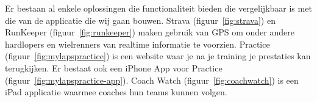 \newcommand{\vergelijkbaresystemen}{}
\label{sec:vergelijkbare-systemen}

Er bestaan al enkele oplossingen die functionaliteit bieden die vergelijkbaar is met die van de applicatie die wij gaan bouwen. Strava (figuur~\ref{fig:strava}) en RunKeeper (figuur~\ref{fig:runkeeper}) maken gebruik van GPS om onder andere hardlopers en wielrenners van realtime informatie te voorzien. \mylaps Practice (figuur~\ref{fig:mylapspractice}) is een website waar je na je training je prestaties kan terugkijken. Er bestaat ook een iPhone App voor \mylaps Practice (figuur~\ref{fig:mylapspractice-app}). Coach Watch (figuur~\ref{fig:coachwatch}) is een iPad applicatie waarmee coaches hun teams kunnen volgen.

\begin{figure}[ht]
\centering
{}


\end{figure}
